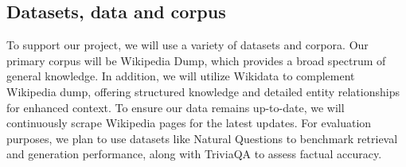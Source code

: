 \documentclass[fleqn,moreauthors,10pt]{ds_report}
\begin{document}
\subsection*{Datasets, data and corpus}
To support our project, we will use a variety of datasets and corpora. Our primary corpus will be Wikipedia Dump, which provides a broad spectrum of general knowledge. In addition, we will utilize Wikidata to complement Wikipedia dump, offering structured knowledge and detailed entity relationships for enhanced context. To ensure our data remains up-to-date, we will continuously scrape Wikipedia pages for the latest updates. For evaluation purposes, we plan to use datasets like Natural Questions to benchmark retrieval and generation performance, along with TriviaQA to assess factual accuracy.  





\end{document}
